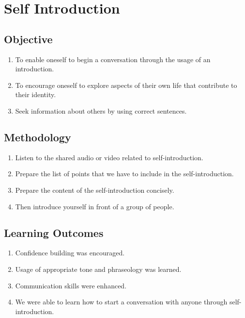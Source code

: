 \section{Self Introduction}
\label{Self Introduction}
\subsection{Objective}

\begin{enumerate}
    \item To enable oneself to begin a conversation through the usage of an introduction.
    \item To encourage oneself to explore aspects of their own life that contribute to their identity.
    \item Seek information about others by using correct sentences.

\end{enumerate}

\subsection{Methodology}

\begin{enumerate}
    \item Listen to the shared audio or video related to self-introduction.
    \item Prepare the list of points that we have to include in the self-introduction.
    \item Prepare the content of the self-introduction concisely.
    \item Then introduce yourself in front of a group of people.
\end{enumerate}

\subsection{Learning Outcomes}

\begin{enumerate}
    \item Confidence building was encouraged.
    \item Usage of appropriate tone and phraseology was learned.
    \item Communication skills were enhanced.
    \item We were able to learn how to start a conversation with anyone through self-introduction.
\end{enumerate}


